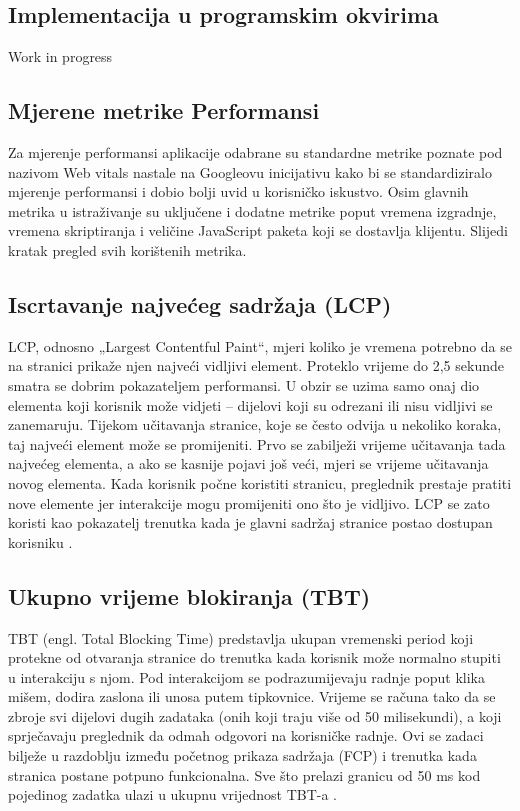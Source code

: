 \subsection{Implementacija u programskim okvirima}
Work in progress

\subsection{Mjerene metrike Performansi}

Za mjerenje performansi aplikacije odabrane su standardne metrike poznate pod nazivom Web vitals nastale na Googleovu inicijativu kako bi se standardiziralo mjerenje performansi i dobio bolji uvid u korisničko iskustvo. Osim glavnih metrika u istraživanje su uključene i dodatne metrike poput vremena izgradnje, vremena skriptiranja i veličine JavaScript paketa koji se dostavlja klijentu. Slijedi kratak pregled svih korištenih metrika.

\subsection{Iscrtavanje najvećeg sadržaja (LCP)}

LCP, odnosno „Largest Contentful Paint“, mjeri koliko je vremena potrebno da se na stranici prikaže njen najveći vidljivi element. Proteklo vrijeme do 2,5 sekunde smatra se dobrim pokazateljem performansi. U obzir se uzima samo onaj dio elementa koji korisnik može vidjeti – dijelovi koji su odrezani ili nisu vidljivi se zanemaruju. Tijekom učitavanja stranice, koje se često odvija u nekoliko koraka, taj najveći element može se promijeniti. Prvo se zabilježi vrijeme učitavanja tada najvećeg elementa, a ako se kasnije pojavi još veći, mjeri se vrijeme učitavanja novog elementa. Kada korisnik počne koristiti stranicu, preglednik prestaje pratiti nove elemente jer interakcije mogu promijeniti ono što je vidljivo. LCP se zato koristi kao pokazatelj trenutka kada je glavni sadržaj stranice postao dostupan korisniku \cite{nordstrom2023comparison}.

\subsection{Ukupno vrijeme blokiranja (TBT)}

TBT (engl. Total Blocking Time) predstavlja ukupan vremenski period koji protekne od otvaranja stranice do trenutka kada korisnik može normalno stupiti u interakciju s njom. Pod interakcijom se podrazumijevaju radnje poput klika mišem, dodira zaslona ili unosa putem tipkovnice. Vrijeme se računa tako da se zbroje svi dijelovi dugih zadataka (onih koji traju više od 50 milisekundi), a koji sprječavaju preglednik da odmah odgovori na korisničke radnje. Ovi se zadaci bilježe u razdoblju između početnog prikaza sadržaja (FCP) i trenutka kada stranica postane potpuno funkcionalna. Sve što prelazi granicu od 50 ms kod pojedinog zadatka ulazi u ukupnu vrijednost TBT-a \cite{nordstrom2023comparison}.

